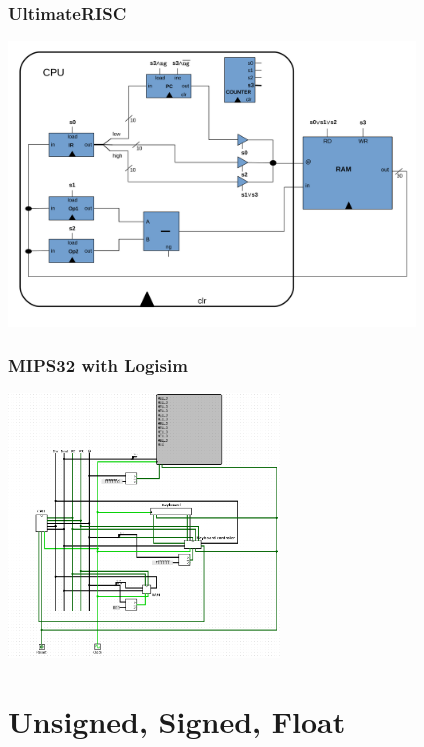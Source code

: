 \documentclass{beamer}
\begin{document}
\begin{frame}%
\frametitle{UltimateRISC}

\vspace{-0.2cm}

\begin{center}
\includegraphics[width=10.8cm]{urisc4.pdf}
\end{center}

\end{frame}

\begin{frame}%
\frametitle{MIPS32 with Logisim}

\vspace{-0.2cm}

\begin{center}
\includegraphics[width=7.2cm]{mips32_logisim.png}
\end{center}

\end{frame}

\section{Unsigned, Signed, Float}
\end{document}
